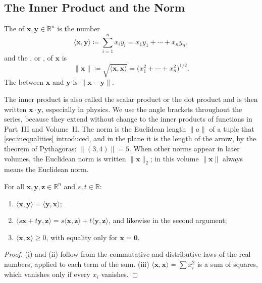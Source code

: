 \subsection{The Inner Product and the Norm}

\begin{definition}
\label{def:inner-product}
The  of $\mathbf x,\mathbf y\in\mathbb R^n$ is the number
\[
\langle\mathbf x,\mathbf y\rangle\coloneqq\sum_{i=1}^nx_iy_i=x_1y_1+\cdots+x_ny_n ,
\]
and the , or , of $\mathbf x$ is
\[
\|\mathbf x\|\coloneqq\sqrt{\langle\mathbf x,\mathbf x\rangle}=\bigl(x_1^2+\cdots+x_n^2\bigr)^{1/2}.
\]
The  between $\mathbf x$ and $\mathbf y$ is $\|\mathbf x-\mathbf y\|$.
\end{definition}

The inner product is also called the scalar product or the dot product and is then written $\mathbf x\cdot\mathbf y$, especially in physics. We use the angle brackets throughout the series, because they extend without change to the inner products of functions in Part~III and Volume~II. The norm is the Euclidean length $\|a\|$ of a tuple that \cref{sec:inequalities} introduced, and in the plane it is the length of the arrow, by the theorem of Pythagoras: $\|(3,4)\|=5$. When other norms appear in later volumes, the Euclidean norm is written $\|\mathbf x\|_2$; in this volume $\|\mathbf x\|$ always means the Euclidean norm.

\begin{proposition}
\label{prop:inner-product}
For all $\mathbf x,\mathbf y,\mathbf z\in\mathbb R^n$ and $s,t\in\mathbb R$:
\begin{enumerate}
\item $\langle\mathbf x,\mathbf y\rangle=\langle\mathbf y,\mathbf x\rangle$;
\item $\langle s\mathbf x+t\mathbf y,\mathbf z\rangle=s\langle\mathbf x,\mathbf z\rangle+t\langle\mathbf y,\mathbf z\rangle$, and likewise in the second argument;
\item $\langle\mathbf x,\mathbf x\rangle\ge0$, with equality only for $\mathbf x=\mathbf 0$.
\end{enumerate}
\end{proposition}

\begin{proof}
(i) and (ii) follow from the commutative and distributive laws of the real numbers, applied to each term of the sum. (iii) $\langle\mathbf x,\mathbf x\rangle=\sum x_i^2$ is a sum of squares, which vanishes only if every $x_i$ vanishes.
\end{proof}

